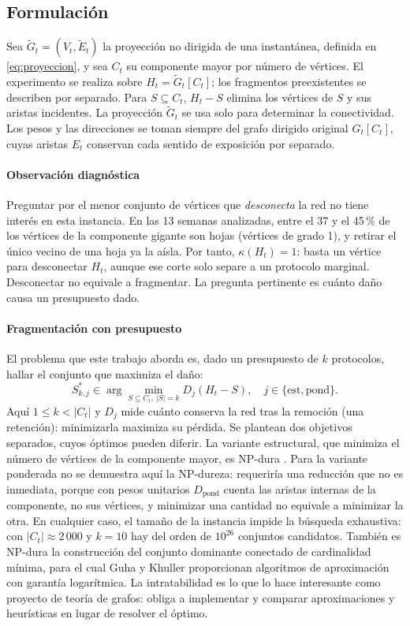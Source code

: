 \documentclass[journal]{IEEEtran}
\begin{document}
\subsection{Formulación}

Sea $\tilde G_t=(V_t,\tilde E_t)$ la proyección no dirigida de una instantánea,
definida en \eqref{eq:proyeccion}, y sea $C_t$ su componente mayor por número de
vértices. El experimento se realiza sobre $H_t=\tilde G_t[C_t]$; los fragmentos
preexistentes se describen por separado. Para $S\subseteq C_t$, $H_t-S$ elimina
los vértices de $S$ y sus aristas incidentes. La proyección $\tilde G_t$ se usa
solo para determinar la conectividad. Los pesos y las direcciones se toman
siempre del grafo dirigido original $G_t[C_t]$, cuyas aristas $E_t$ conservan
cada sentido de exposición por separado.

\paragraph{Observación diagnóstica} Preguntar por el menor conjunto de vértices
que \emph{desconecta} la red no tiene interés en esta instancia. En las 13
semanas analizadas, entre el 37 y el 45\,\% de los vértices de la componente
gigante son hojas (vértices de grado 1), y retirar el único vecino de una hoja
ya la aísla. Por tanto, $\kappa(H_t)=1$: basta un vértice para desconectar
$H_t$, aunque ese corte solo separe a un protocolo marginal. Desconectar no
equivale a fragmentar. La pregunta pertinente es cuánto daño causa un
presupuesto dado.

\paragraph{Fragmentación con presupuesto} El problema que este trabajo aborda es,
dado un presupuesto de $k$ protocolos, hallar el conjunto que maximiza el daño:
\begin{equation}
S^{\ast}_{k,j}\in\arg\min_{S\subseteq C_t,\ |S|=k}D_j(H_t-S),
\quad j\in\{\mathrm{est},\mathrm{pond}\}.
\label{eq:optimo}
\end{equation}
Aquí $1\leq k<|C_t|$ y $D_j$ mide cuánto conserva la red tras la remoción
(una retención): minimizarla maximiza su pérdida. Se plantean dos objetivos separados, cuyos óptimos pueden diferir.
La variante estructural, que minimiza el número de vértices de la componente
mayor, es NP-dura \cite{shen2012interdiction}. Para la variante ponderada no se
demuestra aquí la NP-dureza: requeriría una reducción que no es inmediata,
porque con pesos unitarios $D_{\mathrm{pond}}$ cuenta las aristas internas de
la componente, no sus vértices, y minimizar una cantidad no equivale a
minimizar la otra. En cualquier caso, el tamaño de la instancia impide la
búsqueda exhaustiva: con $|C_t|\approx2\,000$ y $k=10$ hay del orden de
$10^{26}$ conjuntos candidatos. También es NP-dura la construcción del conjunto dominante
conectado de cardinalidad mínima, para el cual Guha y Khuller
\cite{guha1998approximation} proporcionan algoritmos de aproximación con garantía
logarítmica. La intratabilidad es lo que lo hace interesante como proyecto de
teoría de grafos: obliga a implementar y comparar aproximaciones y heurísticas en
lugar de resolver el óptimo.
\end{document}
